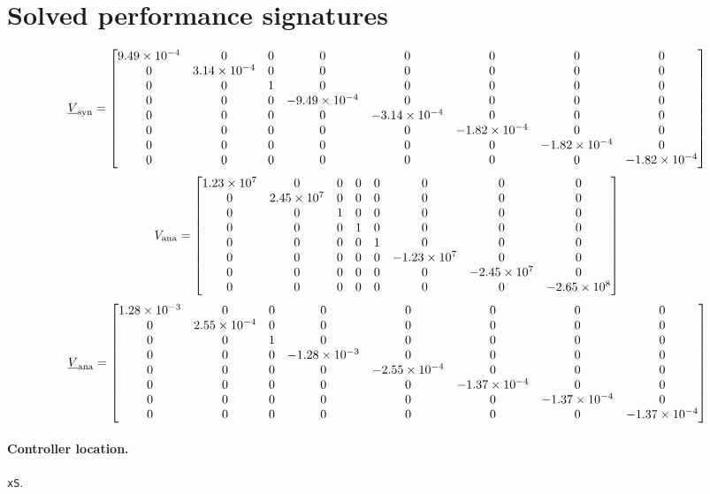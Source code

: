 \documentclass{article}
\begin{document}
\section*{Solved performance signatures}
\[\displaystyle \underline V_{\rm syn}=\begin{bmatrix}9.49\times10^{-4} & 0 & 0 & 0 & 0 & 0 & 0 & 0\\0 & 3.14\times10^{-4} & 0 & 0 & 0 & 0 & 0 & 0\\0 & 0 & 1 & 0 & 0 & 0 & 0 & 0\\0 & 0 & 0 & -9.49\times10^{-4} & 0 & 0 & 0 & 0\\0 & 0 & 0 & 0 & -3.14\times10^{-4} & 0 & 0 & 0\\0 & 0 & 0 & 0 & 0 & -1.82\times10^{-4} & 0 & 0\\0 & 0 & 0 & 0 & 0 & 0 & -1.82\times10^{-4} & 0\\0 & 0 & 0 & 0 & 0 & 0 & 0 & -1.82\times10^{-4}\end{bmatrix}\]
\[\displaystyle V_{\rm ana}=\begin{bmatrix}1.23\times10^{7} & 0 & 0 & 0 & 0 & 0 & 0 & 0\\0 & 2.45\times10^{7} & 0 & 0 & 0 & 0 & 0 & 0\\0 & 0 & 1 & 0 & 0 & 0 & 0 & 0\\0 & 0 & 0 & 1 & 0 & 0 & 0 & 0\\0 & 0 & 0 & 0 & 1 & 0 & 0 & 0\\0 & 0 & 0 & 0 & 0 & -1.23\times10^{7} & 0 & 0\\0 & 0 & 0 & 0 & 0 & 0 & -2.45\times10^{7} & 0\\0 & 0 & 0 & 0 & 0 & 0 & 0 & -2.65\times10^{8}\end{bmatrix}\]
\[\displaystyle \underline V_{\rm ana}=\begin{bmatrix}1.28\times10^{-3} & 0 & 0 & 0 & 0 & 0 & 0 & 0\\0 & 2.55\times10^{-4} & 0 & 0 & 0 & 0 & 0 & 0\\0 & 0 & 1 & 0 & 0 & 0 & 0 & 0\\0 & 0 & 0 & -1.28\times10^{-3} & 0 & 0 & 0 & 0\\0 & 0 & 0 & 0 & -2.55\times10^{-4} & 0 & 0 & 0\\0 & 0 & 0 & 0 & 0 & -1.37\times10^{-4} & 0 & 0\\0 & 0 & 0 & 0 & 0 & 0 & -1.37\times10^{-4} & 0\\0 & 0 & 0 & 0 & 0 & 0 & 0 & -1.37\times10^{-4}\end{bmatrix}\]
\paragraph{Controller location.} \texttt{xS}.
\end{document}
